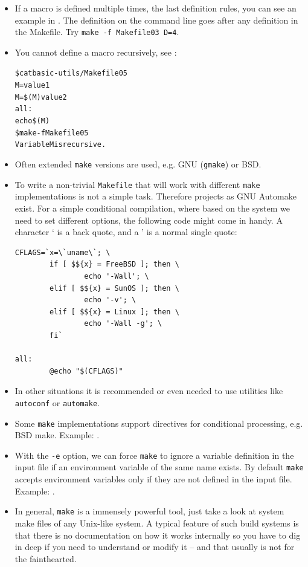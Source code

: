 \begin{itemize}
\item If a macro is defined multiple times, the last definition rules, you can
see an example in .  The definition on the
command line goes after any definition in the Makefile.  Try \texttt{make -f
Makefile03 D=4}.
\item You cannot define a macro recursively, see
:

\begin{alltt}
\$ cat basic-utils/Makefile05
M=value1
M=\$(M) value2
all:
        echo \$(M)
\$ make -f Makefile05
Variable M is recursive.
\end{alltt}
\item Often extended \texttt{make} versions are used, e.g. GNU (\texttt{gmake})
or BSD.
\item To write a non-trivial \texttt{Makefile} that will work with
different \texttt{make} implementations is not a simple task.  Therefore
projects as GNU Automake exist.  For a simple conditional compilation, where
based on the system we need to set different options, the following code might
come in handy.  A character ` is a back quote, and a ' is a normal single quote:

\begin{verbatim}
CFLAGS=`x=\`uname\`; \
        if [ $${x} = FreeBSD ]; then \
                echo '-Wall'; \
        elif [ $${x} = SunOS ]; then \
                echo '-v'; \
        elif [ $${x} = Linux ]; then \
                echo '-Wall -g'; \
        fi`

all:
        @echo "$(CFLAGS)"
\end{verbatim}

\item In other situations it is recommended or even needed to use utilities like
\texttt{autoconf} or \texttt{automake}.
\item Some \texttt{make} implementations support directives for conditional
processing, e.g.  BSD make.  Example: .
\item With the \texttt{-e} option, we can force \texttt{make} to ignore a
variable definition in the input file if an environment variable of the same
name exists.  By default \texttt{make} accepts environment variables only if
they are not defined in the input file.  Example:
\example{basic-utils/Makefile06}.
\item In general, \texttt{make} is a immensely powerful tool, just take a look
at system make files of any Unix-like system.  A typical feature of such build
systems is that there is no documentation on how it works internally so you have
to dig in deep if you need to understand or modify it -- and that usually is not
for the fainthearted.
\end{itemize}


